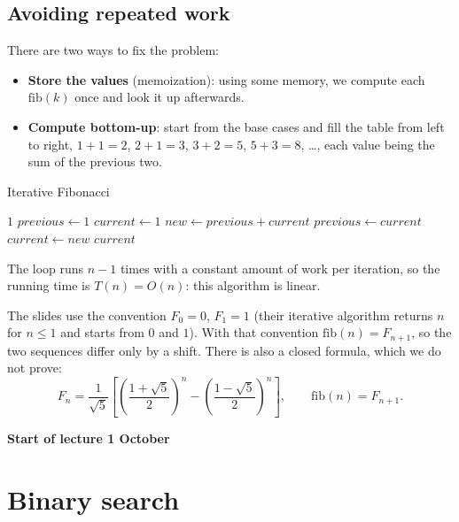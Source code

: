 \documentclass[a4paper,12pt,oneside]{report}
\newcommand{\lecturebanner}[1]{%
  \Needspace{6\baselineskip}%
  \begin{tcolorbox}[colback=yellow!20,colframe=yellow!60!black,
    boxrule=0.4pt,arc=1mm,left=5pt,right=5pt,top=3pt,bottom=3pt,
    before skip=6pt,after skip=6pt]
  \small\textbf{#1}
  \end{tcolorbox}}
\newcommand{\lecturestart}[1]{\lecturebanner{Start of lecture #1}}
\begin{document}
\subsection{Avoiding repeated work}

There are two ways to fix the problem:
\begin{itemize}
  \item \textbf{Store the values} (memoization): using some memory, we
    compute each $\mathrm{fib}(k)$ once and look it up afterwards.
  \item \textbf{Compute bottom-up}: start from the base cases and fill
    the table from left to right, $1+1=2$, $2+1=3$, $3+2=5$,
    $5+3=8$, \ldots, each value being the sum of the previous two.
\end{itemize}

\begin{framedalgo}{Iterative Fibonacci}\label{alg:fib-iterative}
\begin{algorithmic}[1]
      \State \Return $1$
    \EndIf
    \State $\mathit{previous}\gets1$ 
    \State $\mathit{current}\gets1$ 
      \State $\mathit{new}\gets\mathit{previous}+\mathit{current}$
      \State $\mathit{previous}\gets\mathit{current}$
      \State $\mathit{current}\gets\mathit{new}$
    \EndFor
    \State \Return $\mathit{current}$
  \EndFunction
\end{algorithmic}
\end{framedalgo}

The loop runs $n-1$ times with a constant amount of work per iteration,
so the running time is $T(n)=O(n)$: this algorithm is linear.

\begin{notebox}
The slides use the convention $F_0=0$, $F_1=1$ (their iterative
algorithm returns $n$ for $n\leq1$ and starts from $0$ and $1$). With
that convention $\mathrm{fib}(n)=F_{n+1}$, so the two sequences differ
only by a shift. There is also a closed formula, which we do not prove:
\[
  F_n=\frac{1}{\sqrt5}\left[\left(\frac{1+\sqrt5}{2}\right)^{n}
     -\left(\frac{1-\sqrt5}{2}\right)^{n}\right],
  \qquad
  \mathrm{fib}(n)=F_{n+1}.
\]
\end{notebox}

\lecturestart{1 October}

\section{Binary search}
\end{document}
